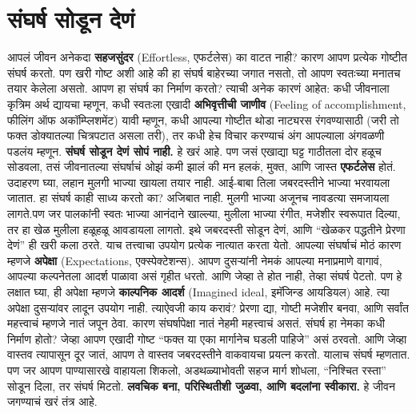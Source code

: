  \chapter{संघर्ष सोडून देणं}
आपलं जीवन अनेकदा \textbf{सहजसुंदर} (Effortless,  एफर्टलेस) का वाटत नाही? कारण आपण प्रत्येक गोष्टीत संघर्ष करतो. पण खरी गोष्ट अशी आहे की हा संघर्ष बाहेरच्या जगात नसतो, तो आपण स्वतःच्या मनातच तयार केलेला असतो.
आपण हा संघर्ष का निर्माण करतो? त्याची अनेक कारणं आहेत: कधी जीवनाला कृत्रिम अर्थ द्यायचा म्हणून, कधी स्वतःला एखादी \textbf{अभिवृत्तीची जाणीव} (Feeling of accomplishment,  फीलिंग ऑफ अकॉम्प्लिशमेंट) यावी म्हणून, कधी आपल्या गोष्टीत थोडा नाट्यरस रंगवण्यासाठी (जरी तो फक्त डोक्यातल्या चित्रपटात असला तरी), तर कधी हेच विचार करण्याचं अंग आपल्याला अंगवळणी पडलंय म्हणून.
\textbf{संघर्ष सोडून देणं सोपं नाही.} हे खरं आहे. पण जसं एखाद्या घट्ट गाठीतला दोर हळूच सोडवला, तसं जीवनातल्या संघर्षाचं ओझं कमी झालं की मन हलकं, मुक्त, आणि जास्त \textbf{एफर्टलेस} होतं.
उदाहरण घ्या,  लहान मुलगी भाज्या खायला तयार नाही. आई-बाबा तिला जबरदस्तीने भाज्या भरवायला जातात.
 हा संघर्ष काही साध्य करतो का? अजिबात नाही. मुलगी भाज्या अजूनच नावडत्या समजायला लागते.पण जर पालकांनी स्वतः भाज्या आनंदाने खाल्ल्या, मुलीला भाज्या रंगीत, मजेशीर स्वरूपात दिल्या, तर हा खेळ मुलीला हळूहळू आवडायला लागतो. इथे जबरदस्ती सोडून देणं, आणि “खेळकर पद्धतीने प्रेरणा देणं”  ही खरी कला ठरते.
याच तत्त्वाचा उपयोग प्रत्येक नात्यात करता येतो. आपल्या संघर्षाचं मोठं कारण म्हणजे \textbf{अपेक्षा} (Expectations,  एक्स्पेक्टेशन्स). आपण दुसऱ्यांनी नेमकं आपल्या मनाप्रमाणे वागावं, आपल्या कल्पनेतला आदर्श पाळावा असं गृहीत धरतो. आणि जेव्हा ते होत नाही, तेव्हा संघर्ष पेटतो.
पण हे लक्षात घ्या,  ही अपेक्षा म्हणजे \textbf{काल्पनिक आदर्श} (Imagined ideal,  इमॅजिन्ड आयडियल) आहे.
 त्या अपेक्षा दुसऱ्यांवर लादून उपयोग नाही. त्याऐवजी काय करावं? प्रेरणा द्या, गोष्टी मजेशीर बनवा, आणि सर्वांत महत्त्वाचं म्हणजे नातं जपून ठेवा. कारण संघर्षापेक्षा नातं नेहमी महत्त्वाचं असतं.
संघर्ष हा नेमका कधी निर्माण होतो? जेव्हा आपण एखादी गोष्ट “फक्त या एका मार्गानेच घडली पाहिजे”
 असं ठरवतो. आणि जेव्हा वास्तव त्यापासून दूर जातं, आपण ते वास्तव जबरदस्तीने वाकवायचा प्रयत्न करतो.
 यालाच संघर्ष म्हणतात.
पण जर आपण पाण्यासारखे वाहायला शिकलो, अडथळ्याभोवती सहज मार्ग शोधला, “निश्चित रस्ता” सोडून दिला, तर संघर्ष मिटतो. \textbf{लवचिक बना, परिस्थितीशी जुळवा, आणि बदलांना स्वीकारा.} हे जीवन जगण्याचं खरं तंत्र आहे.
